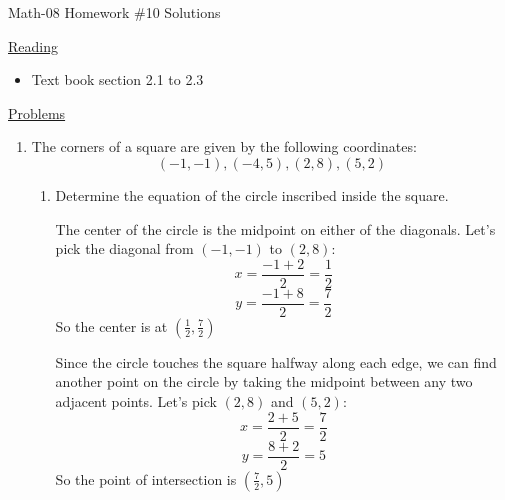 \documentclass[letterpaper,12pt,fleqn]{article}
\begin{document}
\begin{center}
\Large Math-08 Homework \#10 Solutions
\end{center}

\vspace{0.5in}

\underline{Reading}

\begin{itemize}
\item Text book section 2.1 to 2.3
\end{itemize}

\underline{Problems}

\begin{enumerate}
\item The corners of a square are given by the following coordinates:
  \[(-1,-1), (-4,5), (2,8), (5,2)\]
  \begin{enumerate}
  \item Determine the equation of the circle inscribed inside the square.


    The center of the circle is the midpoint on either of the diagonals. Let's
    pick the diagonal from $(-1,-1)$ to $(2,8)$:
    \[x=\frac{-1+2}{2}=\frac{1}{2}\]
    \[y=\frac{-1+8}{2}=\frac{7}{2}\]
    So the center is at $\left(\frac{1}{2},\frac{7}{2}\right)$

    Since the circle touches the square halfway along each edge, we can find
    another point on the circle by taking the midpoint between any two
    adjacent points. Let's pick $(2,8)$ and $(5,2)$:
    \[x=\frac{2+5}{2}=\frac{7}{2}\]
    \[y=\frac{8+2}{2}=5\]
    So the point of intersection is $\left(\frac{7}{2},5\right)$


\end{enumerate}
\end{enumerate}
\end{document}
